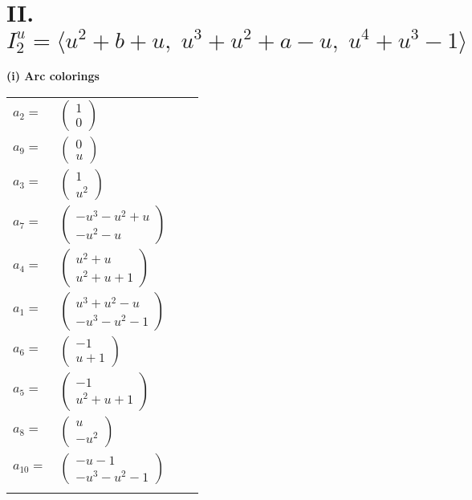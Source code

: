 \documentclass[1p]{elsarticle_modified}
\theoremstyle{definition}
\begin{document}
\centering \section*{II. $I^u_{2}= \langle u^2+b+u,\;u^3+u^2+a- u,\;u^4+u^3-1 \rangle$}
\flushleft \textbf{(i) Arc colorings}\\
\begin{tabular}{m{7pt} m{180pt} m{7pt} m{180pt} }
\flushright $a_{2}=$&$\begin{pmatrix}1\\0\end{pmatrix}$ \\
\flushright $a_{9}=$&$\begin{pmatrix}0\\u\end{pmatrix}$ \\
\flushright $a_{3}=$&$\begin{pmatrix}1\\u^2\end{pmatrix}$ \\
\flushright $a_{7}=$&$\begin{pmatrix}- u^3- u^2+u\\- u^2- u\end{pmatrix}$ \\
\flushright $a_{4}=$&$\begin{pmatrix}u^2+u\\u^2+u+1\end{pmatrix}$ \\
\flushright $a_{1}=$&$\begin{pmatrix}u^3+u^2- u\\- u^3- u^2-1\end{pmatrix}$ \\
\flushright $a_{6}=$&$\begin{pmatrix}-1\\u+1\end{pmatrix}$ \\
\flushright $a_{5}=$&$\begin{pmatrix}-1\\u^2+u+1\end{pmatrix}$ \\
\flushright $a_{8}=$&$\begin{pmatrix}u\\- u^2\end{pmatrix}$ \\
\flushright $a_{10}=$&$\begin{pmatrix}- u-1\\- u^3- u^2-1\end{pmatrix}$\\&\end{tabular}
\end{document}

